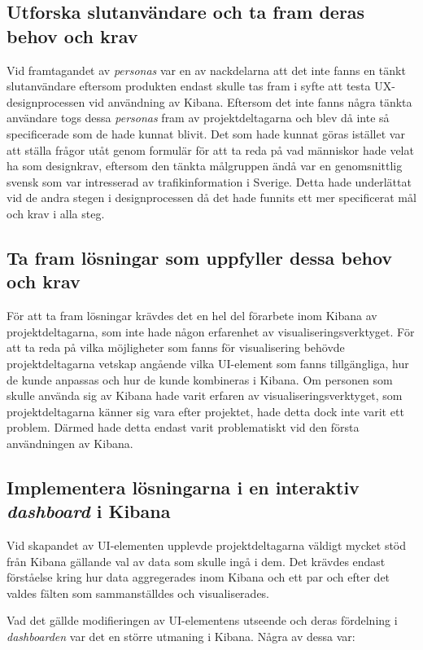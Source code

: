 \documentclass[12pt]{kththesis}
\begin{document}
\subsection{Utforska slutanvändare och ta fram deras behov och krav} 
Vid framtagandet av \textit{personas} var en av nackdelarna att det inte fanns en tänkt slutanvändare eftersom produkten endast skulle tas fram i syfte att testa UX-designprocessen vid användning av Kibana. Eftersom det inte fanns några tänkta användare togs dessa \textit{personas} fram av projektdeltagarna och blev då inte så specificerade som de hade kunnat blivit. Det som hade kunnat göras istället var att ställa frågor utåt genom formulär för att ta reda på vad människor hade velat ha som designkrav, eftersom den tänkta målgruppen ändå var en genomsnittlig svensk som var intresserad av trafikinformation i Sverige. Detta hade underlättat vid de andra stegen i designprocessen då det hade funnits ett mer specificerat mål och krav i alla steg.

\subsection{Ta fram lösningar som uppfyller dessa behov och krav}
För att ta fram lösningar krävdes det en hel del förarbete inom Kibana av projektdeltagarna, som inte hade någon erfarenhet av visualiseringsverktyget. För att ta reda på vilka möjligheter som fanns för visualisering behövde projektdeltagarna vetskap angående vilka UI-element som fanns tillgängliga, hur de kunde anpassas och hur de kunde kombineras i Kibana. Om personen som skulle använda sig av Kibana hade varit erfaren av visualiseringsverktyget, som projektdeltagarna känner sig vara efter projektet, hade detta dock inte varit ett problem. Därmed hade detta endast varit problematiskt vid den första användningen av Kibana.

\subsection{Implementera lösningarna i en interaktiv \textit{dashboard} i Kibana}

Vid skapandet av UI-elementen upplevde projektdeltagarna väldigt mycket stöd från Kibana gällande val av data som skulle ingå i dem. Det krävdes endast förståelse kring hur data aggregerades inom Kibana och ett par och efter det valdes fälten som sammanställdes och visualiserades. 

Vad det gällde modifieringen av UI-elementens utseende och deras fördelning i \textit{dashboarden} var det en större utmaning i Kibana. Några av dessa var:
\end{document}
